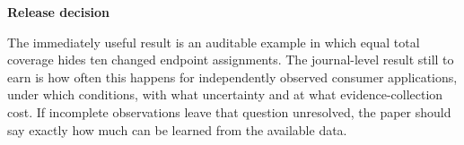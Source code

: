 \documentclass[11pt,a4paper]{article}
\newcommand{\hd}[1]{\par\textbf{\color{accent}#1}\par\nopagebreak}
\begin{document}
\hd{Release decision}
The immediately useful result is an auditable example in which equal total coverage hides ten changed endpoint assignments. The journal-level result still to earn is how often this happens for independently observed consumer applications, under which conditions, with what uncertainty and at what evidence-collection cost. If incomplete observations leave that question unresolved, the paper should say exactly how much can be learned from the available data.
\end{document}
